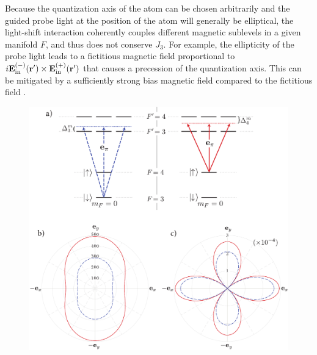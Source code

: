 \documentclass[preprint, aps,pra,onecolumn]{revtex4-1} %
\newcommand{\inp}{{\rm in}}
\begin{document}
Because the quantization axis of the atom can be chosen arbitrarily and the guided probe light at the position of the atom will generally be elliptical, the light-shift interaction coherently couples different magnetic sublevels in a given manifold $F$, and thus does not conserve $J_3$.  For example, the ellipticity of the probe light leads to a fictitious magnetic field proportional to $i \mathbf{E}^{(-)}_{\inp}(\br') \times \mathbf{E}^{(+)}_{\inp}(\br')$ that causes a precession of the quantization axis.  This can be mitigated by a sufficiently strong bias magnetic field compared to the fictitious field \cite{smith_continuous_2004}. 


\begin{figure}
\includegraphics[scale=0.44]{./Figs/Fig_MagicFrequencies_alt}

\end{figure}
\end{document}
